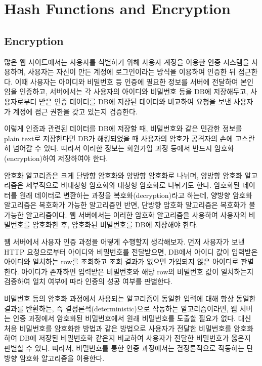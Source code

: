 \section{Hash Functions and Encryption}\label{sect:hash-functions-and-encryption}

\subsection*{Encryption}

많은 웹 사이트에서는 사용자를 식별하기 위해 사용자 계정을 이용한 인증 시스템을 사용하며, 사용자는 자신이 만든 계정에 로그인이라는 방식을 이용하여 인증한 뒤 접근한다. 이때 사용자는 아이디와 비밀번호 등 인증에 필요한 정보를 서버에 전달하여 본인임을 인증하고, 서버에서는 각 사용자의 아이디와 비밀번호 등을 DB에 저장해두고, 사용자로부터 받은 인증 데이터를 DB에 저장된 데이터와 비교하여 요청을 보낸 사용자가 계정에 접근 권한을 갖고 있는지 검증한다.

이렇게 인증과 관련된 데이터를 DB에 저장할 때, 비밀번호와 같은 민감한 정보를 plain text로 저장한다면 DB가 해킹되었을 때 사용자의 암호가 공격자의 손에 고스란히 넘어갈 수 있다. 따라서 이러한 정보는 회원가입 과정 등에서 반드시 암호화(encryption)하여 저장하여야 한다.

암호화 알고리즘은 크게 단방향 암호화와 양방향 암호화로 나뉘며, 양방향 암호화 알고리즘은 세부적으로 비대칭형 암호화와 대칭형 암호화로 나뉘기도 한다. 암호화된 데이터를 원래 데이터로 변환하는 과정을 복호화(decryption)라고 하는데, 양방향 암호화 알고리즘은 복호화가 가능한 알고리즘인 반면, 단방향 암호화 알고리즘은 복호화가 불가능한 알고리즘이다. 웹 서버에서는 이러한 암호화 알고리즘을 사용하여 사용자의 비밀번호를 암호화한 후, 암호화된 비밀번호를 DB에 저장해야 한다.

웹 서버에서 사용자 인증 과정을 어떻게 수행할지 생각해보자. 먼저 사용자가 보낸 HTTP 요청으로부터 아이디와 비밀번호를 전달받으면, DB에서 아이디 값이 입력받은 아이디와 일치하는 row를 조회하고 조회 결과가 없으면 가입되지 않은 아이디로 판별한다. 아이디가 존재하면 입력받은 비밀번호와 해당 row의 비밀번호 값이 일치하는지 검증하여 일치 여부에 따라 인증의 성공 여부를 판별한다.

비밀번호 등의 암호화 과정에서 사용되는 알고리즘이 동일한 입력에 대해 항상 동일한 결과를 반환하는, 즉 결정론적(deterministic)으로 작동하는 알고리즘이라면, 웹 서버는 인증 과정에서 암호화된 비밀번호에서 원래 비밀번호를 도출할 필요가 없다. 대신 처음 비밀번호를 암호화한 방법과 같은 방법으로 사용자가 전달한 비밀번호를 암호화하여 DB에 저장된 비밀번호화 같은지 비교하여 사용자가 전달한 비밀번호가 옳은지 판별할 수 있다. 따라서, 비밀번호를 통한 인증 과정에서는 결정론적으로 작동하는 단방향 암호화 알고리즘을 이용한다.

